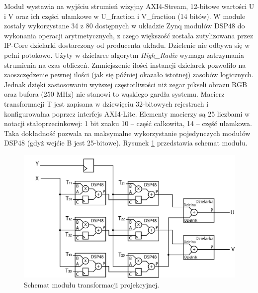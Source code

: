 Moduł wystawia na wyjściu strumień wizyjny AXI4-Stream, 12-bitowe wartości U i V oraz ich części ułamkowe w U\_fraction i V\_fraction (14 bitów). %
W module zostały wykorzystane 34 z 80 dostępnych w układzie Zynq modułów DSP48 do wykonania operacji arytmetycznych, z czego większość została zutylizowana przez IP-Core dzielarki dostarczony od producenta układu. %
Dzielenie nie odbywa się w pełni potokowo. Użyty w dzielarce algorytm \textit{High\_Radix} wymaga zatrzymania strumienia na czas obliczeń. Zmniejszenie ilości instancji dzielarek pozwoliło na zaoszczędzenie pewnej ilości (jak się później okazało istotnej) zasobów logicznych.
Jednak dzięki zastosowaniu wyższej częstotliwości niż zegar pikseli obrazu RGB oraz bufora (250 MHz) nie stanowi to wąskiego gardła systemu. %
Macierz transformacji T jest zapisana w dziewięciu 32-bitowych rejestrach i konfigurowalna poprzez interfejs AXI4-Lite.
Elementy macierzy są 25 liczbami w notacji stałoprzecinkowej: 1 bit znaku 10 – część całkowita, 14 – część ułamkowa. Taka dokładność pozwala na maksymalne wykorzystanie pojedynczych modułów DSP48 (gdyż wejćie B jest 25-bitowe). Rysunek \ref{fig:transfProjek} przedstawia schemat modułu.
\begin{figure}
\centering
\includegraphics[width=0.70\linewidth]{images/transfProjek.png}
\caption[Schemat modułu transformacji projekcyjnej.]{Schemat modułu transformacji projekcyjnej.}
\label{fig:transfProjek}
\end{figure}
